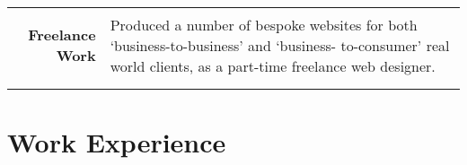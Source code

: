 \documentclass[a4paper, 10pt]{extarticle} %
\begin{document}
\begin{small}
\begin{tabular}{r | p{12cm}}
		\begin{minipage}[t]{2.5cm}
		\begin{flushright}
			\textbf{Freelance Work}
		\end{flushright}
		\end{minipage} 
		
		& 
		
		Produced a number of bespoke websites for both `business-to-business' and `business- to-consumer' real world clients, as a part-time freelance web designer. \\

	\multicolumn{2}{c}{} \\

\end{tabular}
\end{small}



\section{Work Experience}
\end{document}
